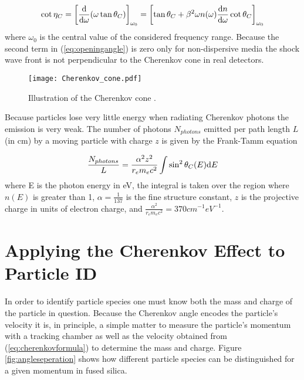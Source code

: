 \begin{equation}
	\cot\eta_C = \left[\frac{\mathrm{d}}{\mathrm{d}\omega}(\omega \tan\theta_{C}) \right]_{\omega_0} = \left[\tan\theta_{C} + \beta^2\omega n(\omega) \frac{\mathrm{d} n}{\mathrm{d}\omega}\cot\theta_{C} \right]_{\omega_0}
	\label{eq:openingangle}
\end{equation}
where $\omega_0$ is the central value of the considered frequency range. Because the second term in (\ref{eq:openingangle}) is zero only for non-dispersive media the shock wave front is not perpendicular to the Cherenkov cone in real detectors.

\begin{figure}[!htb]
	\centering
	\texttt{[image: Cherenkov\_cone.pdf]}
	\caption[Illustration of the Cherenkov cone.]{Illustration of the Cherenkov cone \cite{ParticleDetectionHandbook}.}
	\label{fig:cherenkovcone}
\end{figure}

Because particles lose very little energy when radiating Cherenkov photons the emission is very weak. The number of photons $N_{photons}$ emitted per path length $L$ (in cm) by a moving particle with charge $z$ is given by the Frank-Tamm equation

\begin{equation}
	\frac{N_{photons}}{L} = \frac{\alpha^2 z^2}{r_e m_e c^2} \int \sin^2\theta_{C} (E) \mathrm{d} E
	\label{eq:nphotons}
\end{equation}
%
where E is the photon energy in eV, the integral is taken over the region where $n(E)$ is greater than 1, $\alpha = \frac{1}{137}$ is the fine structure constant, $z$ is the projective charge in units of electron charge, and $\frac{\alpha^2}{r_e m_e c^2} = 370\unit{cm}^{-1}\unit{eV}^{-1}$.

\section{Applying the Cherenkov Effect to Particle ID}
In order to identify particle species one must know both the mass and charge of the particle in question. Because the Cherenkov angle encodes the particle's velocity it is, in principle, a simple matter to measure the particle's momentum with a tracking chamber as well as the velocity obtained from (\ref{eq:cherenkovformula}) to determine the mass and charge. Figure \ref{fig:angleseperation} shows how different particle species can be distinguished for a given momentum in fused silica.

